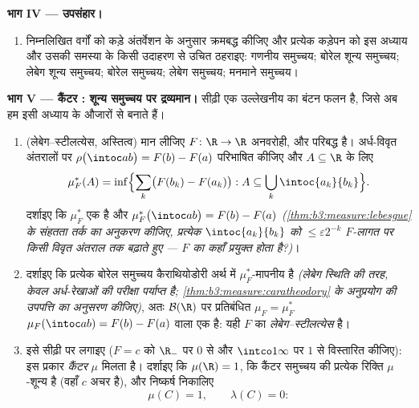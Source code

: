 \begin{problem}
\medskip
\noindent\textbf{भाग IV --- उपसंहार।}
\begin{enumerate}[resume]
  \item निम्नलिखित वर्गों को कड़े अंतर्वेशन के अनुसार क्रमबद्ध
        कीजिए और प्रत्येक कड़ेपन को इस अध्याय और उसकी समस्या के
        किसी उदाहरण से उचित ठहराइए: गणनीय समुच्चय; बोरेल शून्य
        समुच्चय; लेबेग शून्य समुच्चय; बोरेल समुच्चय; लेबेग
        समुच्चय; मनमाने समुच्चय।
\end{enumerate}

\medskip
\noindent\textbf{भाग V --- कैंटर : शून्य समुच्चय पर
द्रव्यमान।} सीढ़ी एक उल्लेखनीय  का बंटन फलन है, जिसे अब हम इसी
अध्याय के औजारों से बनाते हैं।
\begin{enumerate}[resume]
  \item (लेबेग--स्टीलत्येस, अस्तित्व) मान लीजिए $F\colon\R\to\R$ अनवरोही,
         और परिबद्ध है। अर्ध-विवृत अंतरालों पर $\rho\bigl(\intoc ab\bigr) = F(b) -
        F(a)$
        परिभाषित कीजिए और $A \subseteq \R$ के लिए
        \[
        \mu_F^*(A) = \inf\Bigl\{\sum_k\bigl(F(b_k) -
        F(a_k)\bigr) : A \subseteq
        \bigcup_k\intoc{a_k}{b_k}\Bigr\} .
        \]
        दर्शाइए कि $\mu_F^*$ एक  है और
        $\mu_F^*\bigl(\intoc ab\bigr) = F(b) - F(a)$
        \emph{(\cref{thm:b3:measure:lebesgue} के संहतता तर्क का अनुकरण कीजिए, प्रत्येक
        $\intoc{a_k}{b_k}$ को $\leq \varepsilon2^{-k}$ $F$-लागत पर किसी विवृत अंतराल तक बढ़ाते
        हुए --- $F$ का  कहाँ प्रयुक्त होता है?)}।
  \item दर्शाइए कि प्रत्येक बोरेल समुच्चय कैराथियोडोरी अर्थ में
        $\mu_F^*$-मापनीय है \emph{(लेबेग स्थिति की तरह, केवल
        अर्ध-रेखाओं की परीक्षा पर्याप्त है; \cref{thm:b3:measure:caratheodory} के अनुप्रयोग की
        उपपत्ति का अनुसरण कीजिए)}, अतः $\mathcal B(\R)$ पर प्रतिबंधित $\mu_F = \mu_F^*$
        $\mu_F(\intoc ab) = F(b) - F(a)$ वाला एक  है: यही $F$ का \emph{लेबेग--स्टीलत्येस
        } है।
  \item इसे सीढ़ी पर लगाइए ($F = c$ को $\R_-$ पर $0$ से और $\intco1\infty$
        पर $1$ से विस्तारित कीजिए): इस प्रकार \emph{कैंटर }
        $\mu$ मिलता है। दर्शाइए कि $\mu(\R) = 1$, कि कैंटर समुच्चय की
        प्रत्येक रिक्ति $\mu$-शून्य है (वहाँ $c$ अचर है), और
        निष्कर्ष निकालिए
        \[
        \mu(C) = 1, \qquad \lambda(C) = 0 :
\]
\end{enumerate}
\end{problem}
